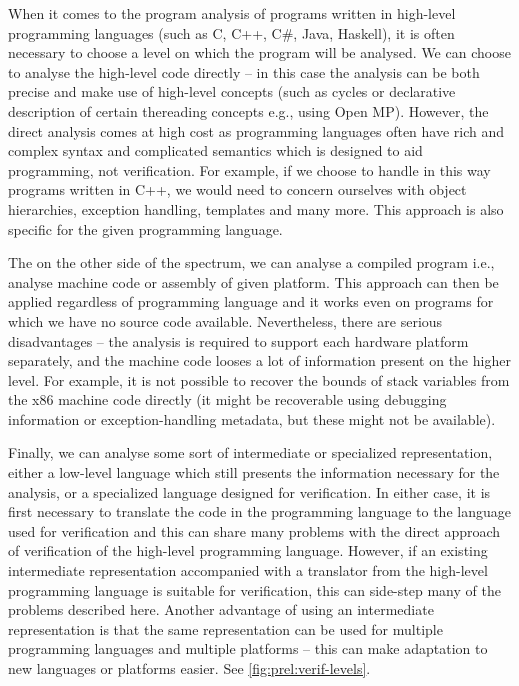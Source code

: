 When it comes to the program analysis of programs written in high-level programming languages (such as C, C++, C\#, Java, Haskell), it is often necessary to choose a level on which the program will be analysed.
We can choose to analyse the high-level code directly -- in this case the analysis can be both precise and make use of high-level concepts (such as cycles or declarative description of certain thereading concepts e.g., using Open MP).
However, the direct analysis comes at high cost as programming languages often have rich and complex syntax and complicated semantics which is designed to aid programming, not verification.
For example, if we choose to handle in this way programs written in C++, we would need to concern ourselves with object hierarchies, exception handling, templates and many more.
This approach is also specific for the given programming language.


The on the other side of the spectrum, we can analyse a compiled program i.e., analyse machine code or assembly of given platform.
This approach can then be applied regardless of programming language and it works even on programs for which we have no source code available.
Nevertheless, there are serious disadvantages -- the analysis is required to support each hardware platform separately, and the machine code looses a lot of information present on the higher level.
For example, it is not possible to recover the bounds of stack variables from the x86 machine code directly (it might be recoverable using debugging information or exception-handling metadata, but these might not be available).

Finally, we can analyse some sort of intermediate or specialized representation, either a low-level language which still presents the information necessary for the analysis, or a specialized language designed for verification.
In either case, it is first necessary to translate the code in the programming language to the language used for verification and this can share many problems with the direct approach of verification of the high-level programming language.
However, if an existing intermediate representation accompanied with a translator from the high-level programming language is suitable for verification, this can side-step many of the problems described here.
Another advantage of using an intermediate representation is that the same representation can be used for multiple programming languages and multiple platforms -- this can make adaptation to new languages or platforms easier.
See \autoref{fig:prel:verif-levels}.

